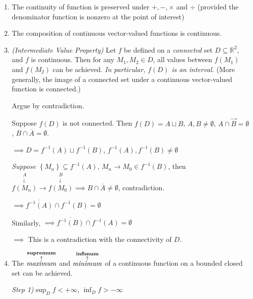 \begin{theorem}
    \begin{enumerate}
        \item The continuity of function is preserved under $+,-,\times$ and $\div$ (provided the denominator function is nonzero at the point of interest)
        \item The composition of continuous vector-valued functions is continuous.
        \item \emph{(Intermediate Value Property)} Let $f$ be defined on a \emph{connected} set $D\subseteq\mathbb{R}^2$, and $f$ is continuous. Then for any $M_1,M_2\in D$, all values between $f\left(M_1\right)$ and $f\left(M_2\right)$ can be achieved. \emph{In particular, $f(D)$ is an interval.} (More generally, the image of a connected set under a continuous vector-valued function is connected.)
              \begin{pf}
                  Argue by contradiction.

                  Suppose $f(D)$ is not connected. Then $f(D)=A\sqcup B$, $A,B\neq\emptyset$, $A\cap\overrightarrow{B}=\emptyset$, $B\cap\overline{A}=\emptyset$.

                  $\implies D=f^{-1}(A)\sqcup f^{-1}(B)$, $f^{-1}(A),f^{-1}(B)\neq\emptyset$

                  \emph{Suppose $\left\{M_n\right\}\subseteq f^{-1}(A)$}, $M_n\to M_0\in f^{-1}(B)$, then $\overset{\substack{A\\\downarrow}}{f\left(M_n\right)}\to\overset{\substack{B\\\downarrow}}{f\left(M_0\right)}\implies B\cap\overline{A}\neq\emptyset$, contradiction.

                  $\implies\overline{f^{-1}(A)}\cap f^{-1}(B)=\emptyset$

                  Similarly, $\implies\overline{f^{-1}(B)}\cap f^{-1}(A)=\emptyset$

                  $\implies$ This is a contradiction with the connectivity of $D$.
              \end{pf}
        \item The $\overset{\substack{\text{\textbf{supremum}}\\\uparrow}}{\text{\emph{maximum}}}$ and $\overset{\substack{\text{\textbf{infimum}}\\\uparrow}}{\text{\emph{minimum}}}$ of a continuous function on a bounded closed set can be achieved.
              \begin{pf}
                  \emph{Step 1)\quad}$\sup_Df<+\infty$, $\inf_Df>-\infty$


\end{pf}
\end{enumerate}
\end{theorem}
